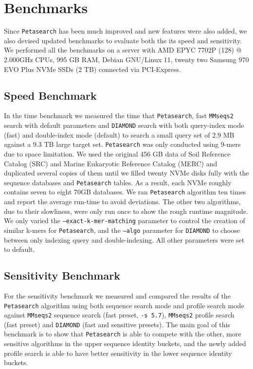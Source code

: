 \section{Benchmarks} \label{section:benchmarks}

Since \texttt{Petasearch} has been much improved and new features were also added, we also devised updated benchmarks to evaluate both the its speed and sensitivity.
We performed all the benchmarks on a server with AMD EPYC 7702P (128) @ 2.000GHz CPUs, 995 GB RAM, Debian GNU/Linux 11, twenty two Samsung 970 EVO Plus NVMe SSDs (2 TB) connected via PCI-Express.

\subsection{Speed Benchmark} \label{section:speed-benchmark}

In the time benchmark we measured the time that \texttt{Petasearch}, fast \texttt{MMseqs2} search with default parameters and \texttt{DIAMOND} search with both query-index mode (fast) and double-index mode (default) to search a small query set of 2.9 MB against a 9.3 TB large target set.
\texttt{Petasearch} was only conducted using 9-mers due to space limitation.
We used the original 456 GB data of Soil Reference Catalog (SRC) and Marine Eukaryotic Reference Catalog (MERC) \cite{steinegger2019plass} and duplicated several copies of them until we filled twenty NVMe disks fully with the sequence databases and \texttt{Petasearch} tables.
As a result, each NVMe roughly contains seven to eight 70GB databases.
We ran \texttt{Petasearch} algorithm ten times and
report the average run-time to avoid deviations.
The other two algorithms, due to their slowliness, were only run once to show the rough runtime magnitude.
We only varied the \texttt{--exact-k-mer-matching} parameter to control the creation of similar k-mers for \texttt{Petasearch}, and the \texttt{--algo} parameter for \texttt{DIAMOND} to choose between only indexing query and double-indexing.
All other parameters were set to default.

\subsection{Sensitivity Benchmark} \label{section:sensitivity-benchmark}

For the sensitivity benchmark we measured and compared the results of the \texttt{Petasearch} algorithm using both sequence search mode and profile search mode against \texttt{MMseqs2} sequence search (fast preset, \texttt{-s 5.7}), \texttt{MMseqs2} profile search (fast preset) and \texttt{DIAMOND} (fast and sensitive presets).
The main goal of this benchmark is to show that \texttt{Petasearch} is able to compete with the other, more sensitive algorithms in the upper sequence identity buckets, and the newly added profile search is able to have better sensitivity in the lower sequence identity buckets.

